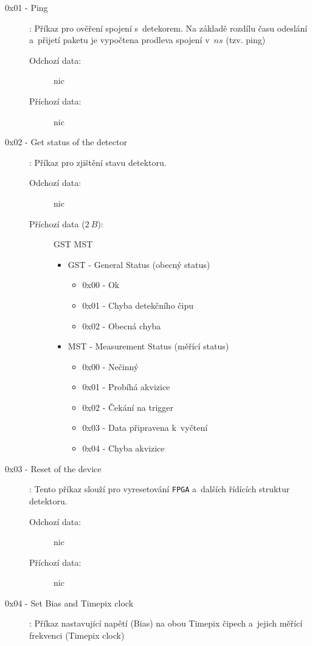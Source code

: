 \begin{description}
	\item[0x01 - Ping]:
		Příkaz pro ověření spojení s~detekorem. Na základě rozdílu času odeslání a~přijetí paketu je vypočtena prodleva spojení v~$ns$ (tzv. ping)
		\begin{description}
			\item[Odchozí data:] nic
			\item[Příchozí data:] nic
		\end{description}
	\item[0x02 - Get status of the detector]:
		Příkaz pro zjištění stavu detektoru.	
		\begin{description}
			\item[Odchozí data:] nic
			\item[Příchozí data ($2~B$):] GST MST
				\begin{itemize}
					\item GST - General Status (obecný status)
						\begin{itemize}
							\item 0x00 - Ok
							\item 0x01 - Chyba detekčního čipu
							\item 0x02 - Obecná chyba
						\end{itemize}
					\item MST - Measurement Status (měřící status)
						\begin{itemize}
							\item 0x00 - Nečinný
							\item 0x01 - Probíhá akvizice
							\item 0x02 - Čekání na trigger
							\item 0x03 - Data připravena k~vyčtení
							\item 0x04 - Chyba akvizice
						\end{itemize}
				\end{itemize}
		\end{description}
	\item[0x03 - Reset of the device]:
		Tento příkaz slouží pro vyresetování \texttt{FPGA} a~dalších řídících struktur detektoru.
		\begin{description}
			\item[Odchozí data:] nic
			\item[Příchozí data:] nic
		\end{description}
	\item[0x04 - Set Bias and Timepix clock]:
		Příkaz nastavující napětí (Bias) na obou Timepix čipech a~jejich měřící frekvenci (Timepix clock)

\end{description}
